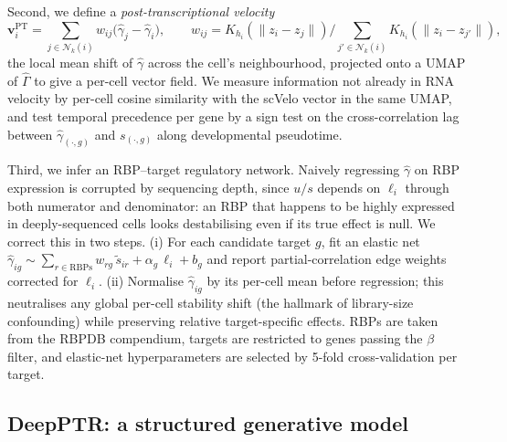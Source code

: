 \documentclass{article}
\begin{document}
Second, we define a \textit{post-transcriptional velocity}
\begin{equation}
  \mathbf{v}_i^{\text{PT}} = \sum_{j \in \mathcal{N}_k(i)} w_{ij} \bigl(\widehat{\gamma}_j - \widehat{\gamma}_i\bigr), \qquad w_{ij} = K_{h_i}(\|z_i - z_j\|) \Big/ \sum_{j' \in \mathcal{N}_k(i)} K_{h_i}(\|z_i - z_{j'}\|),
  \label{eq:ptv}
\end{equation}
the local mean shift of $\widehat{\gamma}$ across the cell's neighbourhood, projected onto a UMAP of $\widehat{\Gamma}$ to give a per-cell vector field. We measure information not already in RNA velocity by per-cell cosine similarity with the scVelo vector in the same UMAP, and test temporal precedence per gene by a sign test on the cross-correlation lag between $\hat{\gamma}_{(\cdot,g)}$ and $s_{(\cdot,g)}$ along developmental pseudotime.

Third, we infer an RBP--target regulatory network. Naively regressing $\widehat{\gamma}$ on RBP expression is corrupted by sequencing depth, since $u/s$ depends on $\ell_i$ through both numerator and denominator: an RBP that happens to be highly expressed in deeply-sequenced cells looks destabilising even if its true effect is null. We correct this in two steps. (i) For each candidate target $g$, fit an elastic net $\widehat{\gamma}_{ig} \sim \sum_{r \in \text{RBPs}} w_{rg}\,\widetilde{s}_{ir} + \alpha_g\,\ell_i + b_g$ and report partial-correlation edge weights corrected for $\ell_i$. (ii) Normalise $\widehat{\gamma}_{ig}$ by its per-cell mean before regression; this neutralises any global per-cell stability shift (the hallmark of library-size confounding) while preserving relative target-specific effects. RBPs are taken from the RBPDB compendium, targets are restricted to genes passing the $\beta$ filter, and elastic-net hyperparameters are selected by 5-fold cross-validation per target.

\subsection{DeepPTR: a structured generative model}
\label{sec:deepptr}
\end{document}
